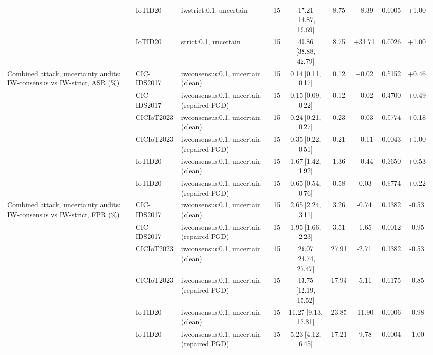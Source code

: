 \begin{table}[t]
\begin{tabular}{lllcccccc}
 & IoTID20 & iwstrict:0.1, uncertain & 15 & 17.21 [14.87, 19.69] & 8.75 & +8.39 & 0.0005 & +1.00 \\
 & IoTID20 & strict:0.1, uncertain & 15 & 40.86 [38.88, 42.79] & 8.75 & +31.71 & 0.0026 & +1.00 \\
Combined attack, uncertainty audits: IW-consensus vs IW-strict, ASR (\%) & CIC-IDS2017 & iwconsensus:0.1, uncertain (clean) & 15 & 0.14 [0.11, 0.17] & 0.12 & +0.02 & 0.5152 & +0.46 \\
 & CIC-IDS2017 & iwconsensus:0.1, uncertain (repaired PGD) & 15 & 0.15 [0.09, 0.22] & 0.12 & +0.02 & 0.4700 & +0.49 \\
 & CICIoT2023 & iwconsensus:0.1, uncertain (clean) & 15 & 0.24 [0.21, 0.27] & 0.23 & +0.03 & 0.9774 & +0.18 \\
 & CICIoT2023 & iwconsensus:0.1, uncertain (repaired PGD) & 15 & 0.35 [0.22, 0.51] & 0.21 & +0.11 & 0.0043 & +1.00 \\
 & IoTID20 & iwconsensus:0.1, uncertain (clean) & 15 & 1.67 [1.42, 1.92] & 1.36 & +0.44 & 0.3650 & +0.53 \\
 & IoTID20 & iwconsensus:0.1, uncertain (repaired PGD) & 15 & 0.65 [0.54, 0.76] & 0.58 & -0.03 & 0.9774 & +0.22 \\
Combined attack, uncertainty audits: IW-consensus vs IW-strict, FPR (\%) & CIC-IDS2017 & iwconsensus:0.1, uncertain (clean) & 15 & 2.65 [2.24, 3.11] & 3.26 & -0.74 & 0.1382 & -0.53 \\
 & CIC-IDS2017 & iwconsensus:0.1, uncertain (repaired PGD) & 15 & 1.95 [1.66, 2.23] & 3.51 & -1.65 & 0.0012 & -0.95 \\
 & CICIoT2023 & iwconsensus:0.1, uncertain (clean) & 15 & 26.07 [24.74, 27.47] & 27.91 & -2.71 & 0.1382 & -0.53 \\
 & CICIoT2023 & iwconsensus:0.1, uncertain (repaired PGD) & 15 & 13.75 [12.19, 15.52] & 17.94 & -5.11 & 0.0175 & -0.85 \\
 & IoTID20 & iwconsensus:0.1, uncertain (clean) & 15 & 11.27 [9.13, 13.81] & 23.85 & -11.90 & 0.0006 & -0.98 \\
 & IoTID20 & iwconsensus:0.1, uncertain (repaired PGD) & 15 & 5.23 [4.12, 6.45] & 17.21 & -9.78 & 0.0004 & -1.00 \\
\bottomrule
\end{tabular}
\end{table}
